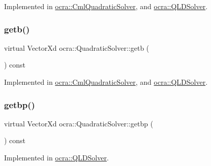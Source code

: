 Implemented in \hyperlink{classocra_1_1CmlQuadraticSolver_a6bbc784066ced7a347a32de698069d07}{ocra\+::\+Cml\+Quadratic\+Solver}, and \hyperlink{classocra_1_1QLDSolver_a267add4e76edafa27e41574e14a5b17f}{ocra\+::\+Q\+L\+D\+Solver}.

\hypertarget{classocra_1_1QuadraticSolver_ac051c6a779ce6a6e6e6657cfd3e1f65f}{}\label{classocra_1_1QuadraticSolver_ac051c6a779ce6a6e6e6657cfd3e1f65f} 
\subsubsection{\texorpdfstring{getb()}{getb()}}
{\footnotesize\ttfamily virtual Vector\+Xd ocra\+::\+Quadratic\+Solver\+::getb (\begin{DoxyParamCaption}{ }\end{DoxyParamCaption}) const\hspace{0.3cm}{\ttfamily [pure virtual]}}



Implemented in \hyperlink{classocra_1_1CmlQuadraticSolver_a1af1421b10bd780438cef59ac0293749}{ocra\+::\+Cml\+Quadratic\+Solver}, and \hyperlink{classocra_1_1QLDSolver_af206f7c0caa5a02c505d613bf3888eea}{ocra\+::\+Q\+L\+D\+Solver}.

\hypertarget{classocra_1_1QuadraticSolver_af5cc64ada014e8caf3d2c994eaa1c48a}{}\label{classocra_1_1QuadraticSolver_af5cc64ada014e8caf3d2c994eaa1c48a} 
\subsubsection{\texorpdfstring{getbp()}{getbp()}}
{\footnotesize\ttfamily virtual Vector\+Xd ocra\+::\+Quadratic\+Solver\+::getbp (\begin{DoxyParamCaption}{ }\end{DoxyParamCaption}) const\hspace{0.3cm}{\ttfamily [pure virtual]}}



Implemented in \hyperlink{classocra_1_1QLDSolver_abefe0e7142a6d9d5094d8ae6816cce91}{ocra\+::\+Q\+L\+D\+Solver}.

\hypertarget{classocra_1_1QuadraticSolver_a0babcde3ffe8770131b5f842da01c49c}{}\label{classocra_1_1QuadraticSolver_a0babcde3ffe8770131b5f842da01c49c} 
